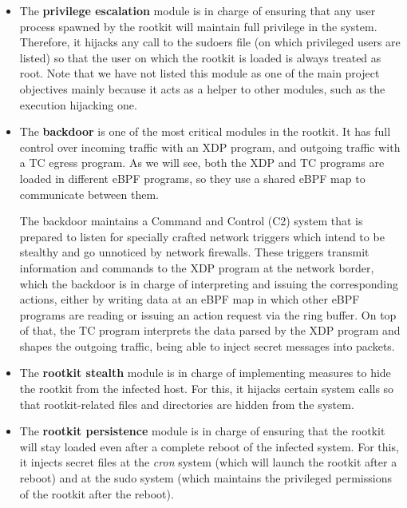 \begin{itemize}
\item The \textbf{privilege escalation} module is in charge of ensuring that any user process spawned by the rootkit will maintain full privilege in the system. Therefore, it hijacks any call to the sudoers file (on which privileged users are listed) so that the user on which the rootkit is loaded is always treated as root. Note that we have not listed this module as one of the main project objectives mainly because it acts as a helper to other modules, such as the execution hijacking one.

\item The \textbf{backdoor} is one of the most critical modules in the rootkit. It has full control over incoming traffic with an XDP program, and outgoing traffic with a TC egress program. As we will see, both the XDP and TC programs are loaded in different eBPF programs, so they use a shared eBPF map to communicate between them.

The backdoor maintains a Command and Control (C2) system that is prepared to listen for specially crafted network triggers which intend to be stealthy and go unnoticed by network firewalls. These triggers transmit information and commands to the XDP program at the network border, which the backdoor is in charge of interpreting and issuing the corresponding actions, either by writing data at an eBPF map in which other eBPF programs are reading or issuing an action request via the ring buffer. On top of that, the TC program interprets the data parsed by the XDP program and shapes the outgoing traffic, being able to inject secret messages into packets. 

\item The \textbf{rootkit stealth} module is in charge of implementing measures to hide the rootkit from the infected host. For this, it hijacks certain system calls so that rootkit-related files and directories are hidden from the system.

\item The \textbf{rootkit persistence} module is in charge of ensuring that the rootkit will stay loaded even after a complete reboot of the infected system. For this, it injects secret files at the \textit{cron} system (which will launch the rootkit after a reboot) and at the sudo system (which maintains the privileged permissions of the rootkit after the reboot).


\end{itemize}
